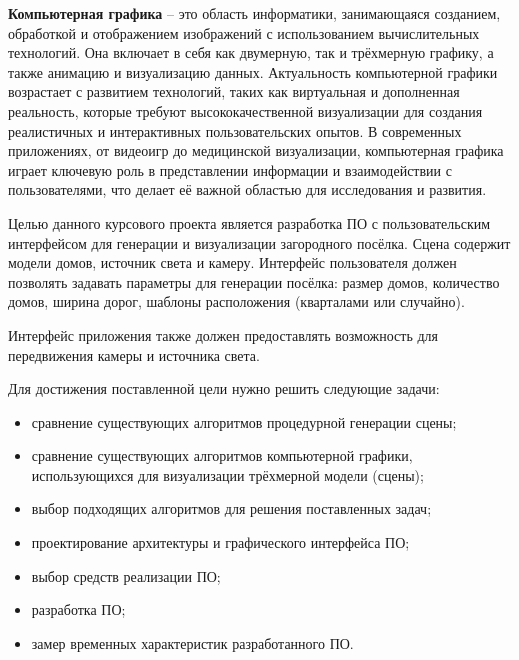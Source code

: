
\textbf{Компьютерная графика} -- это область информатики, занимающаяся созданием, обработкой и отображением изображений с использованием вычислительных технологий. Она включает в себя как двумерную, так и трёхмерную графику, а также анимацию и визуализацию данных. Актуальность компьютерной графики возрастает с развитием технологий, таких как виртуальная и дополненная реальность, которые требуют высококачественной визуализации для создания реалистичных и интерактивных пользовательских опытов. В современных приложениях, от видеоигр до медицинской визуализации, компьютерная графика играет ключевую роль в представлении информации и взаимодействии с пользователями, что делает её важной областью для исследования и развития.

Целью данного курсового проекта является разработка ПО с пользовательским интерфейсом для генерации и визуализации загородного посёлка. Сцена содержит модели домов, источник света и камеру. Интерфейс пользователя должен позволять задавать параметры для генерации посёлка: размер домов, количество домов, ширина дорог, шаблоны расположения (кварталами или случайно). 

Интерфейс приложения также должен предоставлять возможность для передвижения камеры и источника света.

Для достижения поставленной цели нужно решить следующие задачи:
\begin{itemize}
  \item сравнение существующих алгоритмов процедурной генерации сцены;
  \item сравнение существующих алгоритмов компьютерной графики, использующихся для визуализации трёхмерной модели (сцены);
  \item выбор подходящих алгоритмов для решения поставленных задач;
  \item проектирование архитектуры и графического интерфейса ПО;
  \item выбор средств реализации ПО;
  \item разработка ПО;
  \item замер временных характеристик разработанного ПО.
\end{itemize}
\clearpage